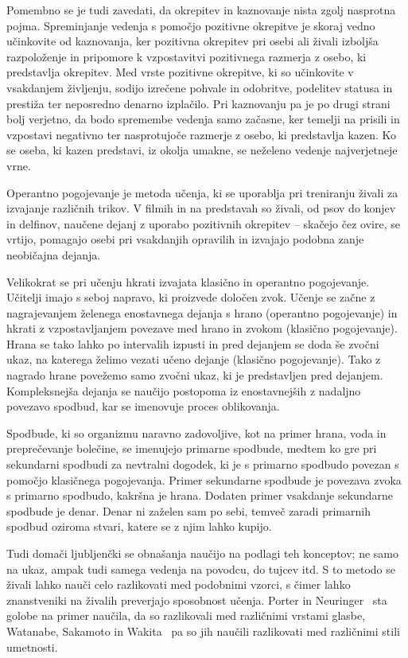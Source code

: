 \documentclass[a4paper, oneside, 12pt]{report}
\begin{document}
Pomembno se je tudi zavedati, da okrepitev in kaznovanje nista zgolj nasprotna pojma. Spreminjanje vedenja s pomočjo pozitivne okrepitve je skoraj vedno učinkovite od kaznovanja, ker pozitivna okrepitev pri osebi ali živali izboljša razpoloženje in pripomore k vzpostavitvi pozitivnega razmerja z osebo, ki predstavlja okrepitev. Med vrste pozitivne okrepitve, ki so učinkovite v vsakdanjem življenju, sodijo izrečene pohvale in odobritve, podelitev statusa in prestiža ter neposredno denarno izplačilo. Pri kaznovanju pa je po drugi strani bolj verjetno, da bodo spremembe vedenja samo začasne, ker temelji na prisili in vzpostavi negativno ter nasprotujoče razmerje z osebo, ki predstavlja kazen. Ko se oseba, ki kazen predstavi, iz okolja umakne, se neželeno vedenje najverjetneje vrne.~\cite{IntroductionToPsychology}

Operantno pogojevanje je metoda učenja, ki se uporablja pri treniranju živali za izvajanje različnih trikov. V filmih in na predstavah so živali, od psov do konjev in delfinov, naučene dejanj z uporabo pozitivnih okrepitev -- skačejo čez ovire, se vrtijo, pomagajo osebi pri vsakdanjih opravilih in izvajajo podobna zanje neobičajna dejanja.~\cite{IntroductionToPsychology}

Velikokrat se pri učenju hkrati izvajata klasično in operantno pogojevanje. Učitelji imajo s seboj napravo, ki proizvede določen zvok. Učenje se začne z nagrajevanjem želenega enostavnega dejanja s hrano (operantno pogojevanje) in hkrati z vzpostavljanjem povezave med hrano in zvokom (klasično pogojevanje). Hrana se tako lahko po intervalih izpusti in pred dejanjem se doda še zvočni ukaz, na katerega želimo vezati učeno dejanje (klasično pogojevanje). Tako z nagrado hrane povežemo samo zvočni ukaz, ki je predstavljen pred dejanjem. Kompleksnejša dejanja se naučijo postopoma iz enostavnejših z nadaljno povezavo spodbud, kar se imenovuje proces oblikovanja.~\cite{IntroductionToPsychology}

Spodbude, ki so organizmu naravno zadovoljive, kot na primer hrana, voda in preprečevanje bolečine, se imenujejo primarne spodbude, medtem ko gre pri sekundarni spodbudi za nevtralni dogodek, ki je s primarno spodbudo povezan s pomočjo klasičnega pogojevanja. Primer sekundarne spodbude je povezava zvoka s primarno spodbudo, kakršna je hrana. Dodaten primer vsakdanje sekundarne spodbude je denar. Denar ni zaželen sam po sebi, temveč zaradi primarnih spodbud oziroma stvari, katere se z njim lahko kupijo.~\cite{IntroductionToPsychology}

Tudi domači ljubljenčki se obnašanja naučijo na podlagi teh konceptov; ne samo na ukaz, ampak tudi samega vedenja na povodcu, do tujcev itd. S to metodo se živali lahko nauči celo razlikovati med podobnimi vzorci, s čimer lahko znanstveniki na živalih preverjajo sposobnost učenja. Porter in Neuringer~\cite{MusicDiscriminationByPigeons} sta golobe na primer naučila, da so razlikovali med različnimi vrstami glasbe, Watanabe, Sakamoto in Wakita~\cite{PigeonsDiscriminationOfPaintings} pa so jih naučili razlikovati med različnimi stili umetnosti.
\end{document}
